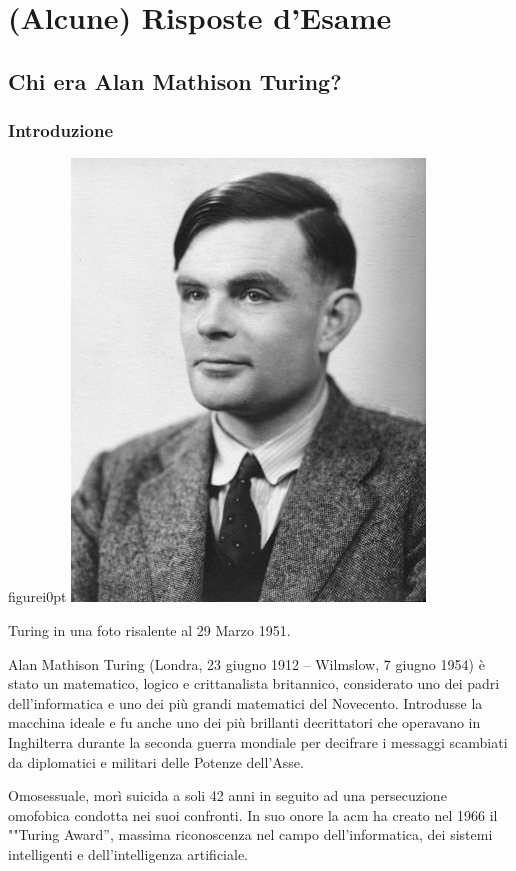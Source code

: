 \newpage

\section{(Alcune) Risposte d'Esame}
	\subsection{Chi era Alan Mathison Turing?}
	\label{subsec:turing}

		\subsubsection{Introduzione}
\begin{wrapfloat}{figure}{i}{0pt}
	\includegraphics[width=0.6\columnwidth]{immagini/turing_photo}
	\caption[A. M. Turing]{Turing in una foto risalente al 29 Marzo 1951.}
	\label{fig:tur}
\end{wrapfloat}
Alan Mathison Turing (Londra, 23 giugno 1912 -- Wilmslow, 7 giugno 1954) è stato un matematico, logico e crittanalista britannico, considerato uno dei padri dell'informatica e uno dei più grandi matematici del Novecento. Introdusse la macchina ideale e fu anche uno dei più brillanti decrittatori che operavano in Inghilterra durante la seconda guerra mondiale per decifrare i messaggi scambiati da diplomatici e militari delle Potenze dell'Asse.

Omosessuale, morì suicida a soli 42 anni in seguito ad una persecuzione omofobica condotta nei suoi confronti. In suo onore la \ac{acm} ha creato nel 1966 il ""Turing Award'', massima riconoscenza nel campo dell'informatica, dei sistemi intelligenti e dell'intelligenza artificiale.

